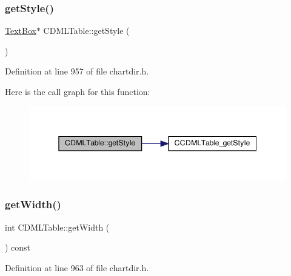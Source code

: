 \subsubsection{\texorpdfstring{get\+Style()}{getStyle()}}
{\footnotesize\ttfamily \hyperlink{class_text_box}{Text\+Box}$\ast$ C\+D\+M\+L\+Table\+::get\+Style (\begin{DoxyParamCaption}{ }\end{DoxyParamCaption})\hspace{0.3cm}{\ttfamily [inline]}}



Definition at line 957 of file chartdir.\+h.

Here is the call graph for this function\+:
\nopagebreak
\begin{figure}[H]
\begin{center}
\leavevmode
\includegraphics[width=345pt]{class_c_d_m_l_table_af43e533e15a7d7af5699bb7b695f30ba_cgraph}
\end{center}
\end{figure}
\mbox{\label{class_c_d_m_l_table_abe6213c358907a33d677ee3c18c74199}} 
\subsubsection{\texorpdfstring{get\+Width()}{getWidth()}}
{\footnotesize\ttfamily int C\+D\+M\+L\+Table\+::get\+Width (\begin{DoxyParamCaption}{ }\end{DoxyParamCaption}) const\hspace{0.3cm}{\ttfamily [inline]}}



Definition at line 963 of file chartdir.\+h.

